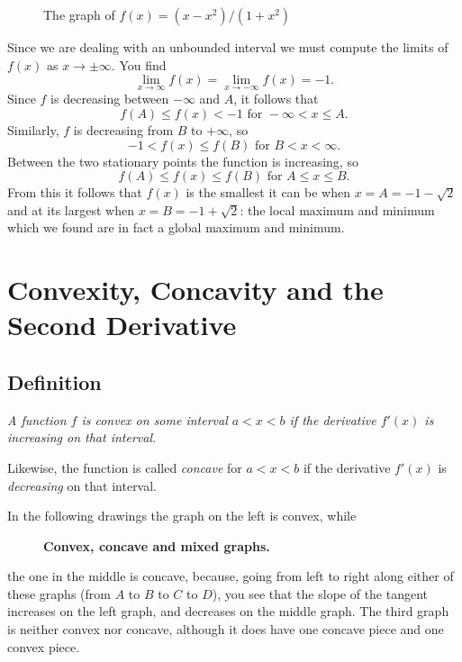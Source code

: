 \begin{figure}[h]
  \centering 
  \caption{The graph of $f(x) = (x-x^2)/(1+x^2)$}
  \label{fig:05rationalexample}
\end{figure}

Since we are dealing with an unbounded interval we must compute the limits of
$f(x)$ as $x\to\pm\infty$.  You find
\[
\lim_{x\to\infty} f(x) = \lim_{x\to-\infty} f(x) = -1.
\]
Since $f$ is decreasing between $-\infty$ and $A$, it follows that
\[
f(A) \leq f(x) < - 1 \text{ for } -\infty<x\leq A.
\]
Similarly, $f$ is decreasing from $B$ to $+\infty$, so
\[
-1< f(x) \leq f(B) \text{ for } B < x<\infty.
\]
Between the two stationary points the function is increasing, so
\[
f(A) \leq f(x) \leq f(B) \text{ for } A\leq x\leq B.
\]
From this it follows that $f(x)$ is the smallest it can be when $x=A=-1-\surd2$
and at its largest when $x=B=-1+\surd2$: the local maximum and minimum which we
found are in fact a global maximum and minimum.



\section{Convexity, Concavity and the Second Derivative}

\subsection{Definition}
\itshape A function $f$ is \emph{convex} on some interval
$a<x<b$ if the derivative $f'(x)$ is \emph{increasing} on that interval.

Likewise, the function is called \emph{concave} for $a<x<b$ if the derivative
$f'(x)$ is \emph{decreasing} on that interval.


\upshape\smallskip

In the following drawings the graph on the left is convex, while
\begin{figure}[h]\centering
  \parbox{115pt}{ }
  \parbox{115pt}{ }
  \parbox{115pt}{ }
  \caption{\textbf{Convex, concave and mixed graphs.}}
  \label{fig:05concave-convex-examples}
\end{figure}
the one in the middle is concave, because, going from left to right along either of
these graphs (from $A$ to $B$ to $C$ to $D$), you see that the slope of the
tangent increases on the left graph, and decreases on the middle graph.
The third graph is neither convex nor concave, although it does have one concave
piece and one convex piece.

